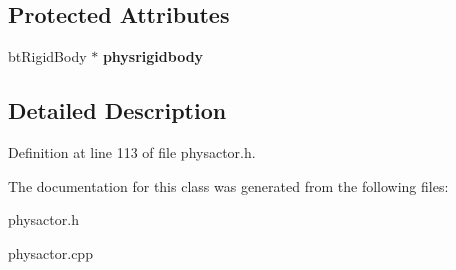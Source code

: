 \subsection*{Protected Attributes}
\begin{DoxyCompactItemize}
\item 
\hypertarget{classActorDynRigid_a83a6cb758304431043c6bfa05b47ecb2}{
btRigidBody $\ast$ {\bfseries physrigidbody}}
\label{d4/d0e/classActorDynRigid_a83a6cb758304431043c6bfa05b47ecb2}

\end{DoxyCompactItemize}


\subsection{Detailed Description}


Definition at line 113 of file physactor.h.

The documentation for this class was generated from the following files:\begin{DoxyCompactItemize}
\item 
physactor.h\item 
physactor.cpp\end{DoxyCompactItemize}
